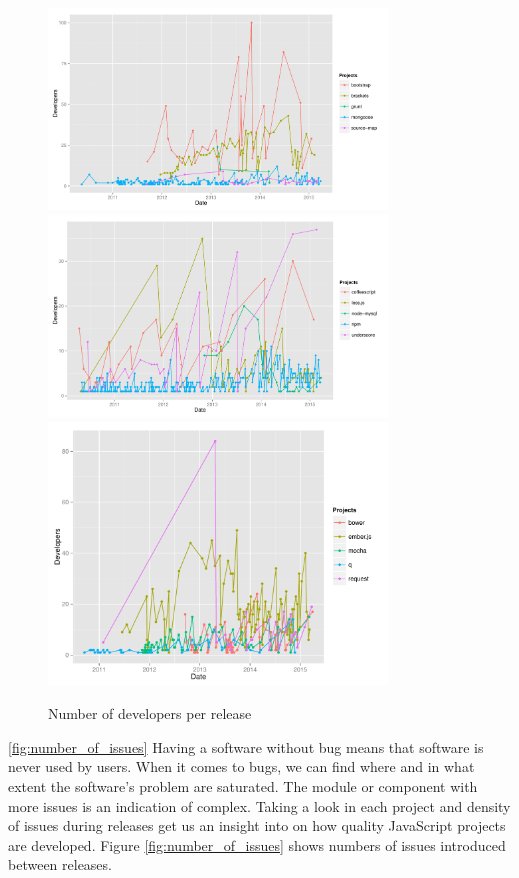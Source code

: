 \begin{figure}[thb!]
	\caption{Number of developers per release}
	\label{fig:number_of_developers}
	\includegraphics[width=90mm,scale=0.5]{figures/number_of_developers}
	\includegraphics[width=90mm,scale=0.5]{figures/number_of_developers_2}
		\includegraphics[width=90mm,scale=0.5]{figures/number_of_developers_3}
\end{figure}


\ref{fig:number_of_issues}
Having a software without bug means that software is never used by users. When it comes to bugs, we can find where and in what extent the software's problem are saturated. The module or component with more issues is an indication of complex. Taking a look in each project and density of issues during releases get us an insight into on how quality JavaScript projects are developed. Figure \ref{fig:number_of_issues} shows numbers of issues introduced between releases.

